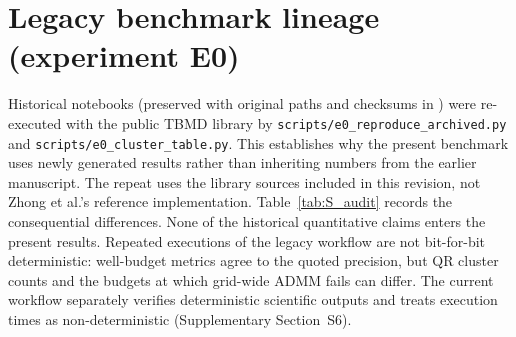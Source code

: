 \section{Legacy benchmark lineage (experiment E0)}
\label{sec:S_audit}
Historical notebooks (preserved with original paths and checksums in ) were re-executed with the public TBMD library by \texttt{scripts/e0\_reproduce\_archived.py} and \texttt{scripts/e0\_cluster\_table.py}. This establishes why the present benchmark uses newly generated results rather than inheriting numbers from the earlier manuscript. The repeat uses the library sources included in this revision, not Zhong et al.'s reference implementation. Table~\ref{tab:S_audit} records the consequential differences. None of the historical quantitative claims enters the present results. Repeated executions of the legacy workflow are not bit-for-bit deterministic: well-budget metrics agree to the quoted precision, but QR cluster counts and the budgets at which grid-wide ADMM fails can differ. The current workflow separately verifies deterministic scientific outputs and treats execution times as non-deterministic (Supplementary Section~S6).

